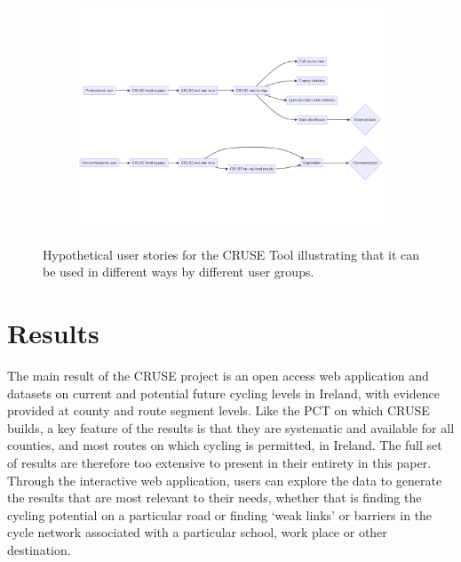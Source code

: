 \documentclass[
  super,
  preprint,
  3p]{elsarticle}
\begin{document}
\begin{figure}

{\centering 

\begin{figure}[H]

{\centering \includegraphics{paper_files/figure-latex/mermaid-figure-1.png}

}

\end{figure}

}

\caption{\label{fig-user-stories}Hypothetical user stories for the CRUSE
Tool illustrating that it can be used in different ways by different
user groups.}

\end{figure}

\hypertarget{sec-results}{%
\section{Results}\label{sec-results}}

The main result of the CRUSE project is an open access web application
and datasets on current and potential future cycling levels in Ireland,
with evidence provided at county and route segment levels. Like the PCT
on which CRUSE builds, a key feature of the results is that they are
systematic and available for all counties, and most routes on which
cycling is permitted, in Ireland. The full set of results are therefore
too extensive to present in their entirety in this paper. Through the
interactive web application, users can explore the data to generate the
results that are most relevant to their needs, whether that is finding
the cycling potential on a particular road or finding `weak links' or
barriers in the cycle network associated with a particular school, work
place or other destination.
\end{document}
